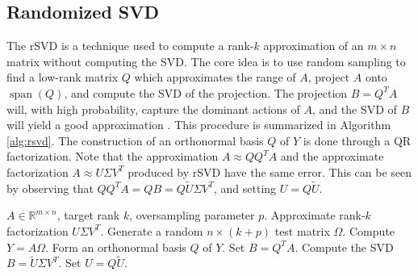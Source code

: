 \subsection{Randomized SVD}
The rSVD is a technique used to compute a rank-$k$ approximation of an $m\times n$ matrix without computing the SVD. The core idea is to use random sampling to find a low-rank matrix $Q$ which approximates the range of $A$, project $A$ onto $\operatorname{span}(Q)$, and compute the SVD of the projection. The projection $B=Q^TA$ will, with high probability, capture the dominant actions of $A$, and the SVD of $B$ will yield a good approximation \cite{halkoFindingStructureRandomness2011}. This procedure is summarized in Algorithm \ref{alg:rsvd}. The construction of an orthonormal basis $Q$ of $Y$ is done through a QR factorization. Note that the approximation $A\approx QQ^T A$ and the approximate factorization $A\approx U\Sigma V^T$ produced by rSVD have the same error. This can be seen by observing that $QQ^TA = QB = Q\tilde U\Sigma V^T$, and setting $U=Q\tilde U$.
\begin{algorithm}[!htbp]
\caption{rSVD}
\label{alg:rsvd}
\begin{algorithmic}[1]
    \Require $A\in\mathbb R^{m\times n}$, target rank $k$, oversampling parameter $p$.
    \Ensure Approximate rank-$k$ factorization $U\Sigma V^T$.
    \State Generate a random $n\times(k+p)$ test matrix $\Omega$.
    \State Compute $Y = A\Omega$.
    \State Form an orthonormal basis $Q$ of $Y$.
    \State Set $B = Q^TA$.
    \State Compute the SVD $B = \tilde U\Sigma V^T$.
    \State Set $U = Q\tilde U$. 
\end{algorithmic}
\end{algorithm}